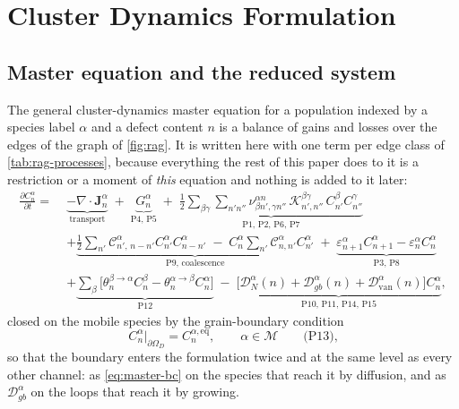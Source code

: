 \section{Cluster Dynamics Formulation}\label{sec:formulation}

\subsection{Master equation and the reduced system}
\label{sec:master}

The general cluster-dynamics master equation for a population indexed by a
species label $\alpha$ and a defect content $n$ is a balance of gains and losses
over the edges of the graph of \cref{fig:rag}. It is written here with one term
per edge class of \cref{tab:rag-processes}, because everything the rest of this
paper does to it is a restriction or a moment of \emph{this} equation and
nothing is added to it later:
\begin{align}
  \frac{\partial C^{\alpha}_{n}}{\partial t}
  =\;&\underbrace{-\nabla\!\cdot\!\bm J^{\alpha}_{n}}_{\text{transport}}
   \;+\;\underbrace{G^{\alpha}_{n}}_{\text{P4, P5}}
   \;+\;\underbrace{\tfrac12\sum_{\beta\gamma}\sum_{n'n''}
        \nu^{\alpha n}_{\beta n',\gamma n''}\,
        \mathcal K^{\beta\gamma}_{n',n''}\,C^{\beta}_{n'}C^{\gamma}_{n''}}
        _{\text{P1, P2, P6, P7}}
   \nonumber\\[2pt]
  &+\underbrace{\tfrac12\sum_{n'}\mathcal C^{\alpha}_{n',\,n-n'}
        C^{\alpha}_{n'}C^{\alpha}_{n-n'}
      \;-\;C^{\alpha}_{n}\sum_{n'}\mathcal C^{\alpha}_{n,n'}C^{\alpha}_{n'}}
        _{\text{P9, coalescence}}
   \;+\;\underbrace{\varepsilon^{\alpha}_{n+1}C^{\alpha}_{n+1}
        -\varepsilon^{\alpha}_{n}C^{\alpha}_{n}}_{\text{P3, P8}}
   \nonumber\\[2pt]
  &+\underbrace{\sum_{\beta}\bigl[\theta^{\beta\to\alpha}_{n}C^{\beta}_{n}
        -\theta^{\alpha\to\beta}_{n}C^{\alpha}_{n}\bigr]}_{\text{P12}}
   \;-\;\underbrace{\bigl[\mathcal D^{\alpha}_{N}(n)
        +\mathcal D^{\alpha}_{gb}(n)
        +\mathcal D^{\alpha}_{\mathrm{van}}(n)\bigr]C^{\alpha}_{n}}
        _{\text{P10, P11, P14, P15}} ,
  \label{eq:master}
\end{align}
closed on the mobile species by the grain-boundary condition
\begin{equation}
  C^{\alpha}_{n}\big|_{\partial\Omega_D}=C^{\alpha,\mathrm{eq}}_{n},
  \qquad \alpha\in\mathcal M
  \qquad\text{(P13),}
  \label{eq:master-bc}
\end{equation}
so that the boundary enters the formulation twice and at the same level as
every other channel: as \cref{eq:master-bc} on the species that reach it by
diffusion, and as $\mathcal D^{\alpha}_{gb}$ on the loops that reach it by
growing.

